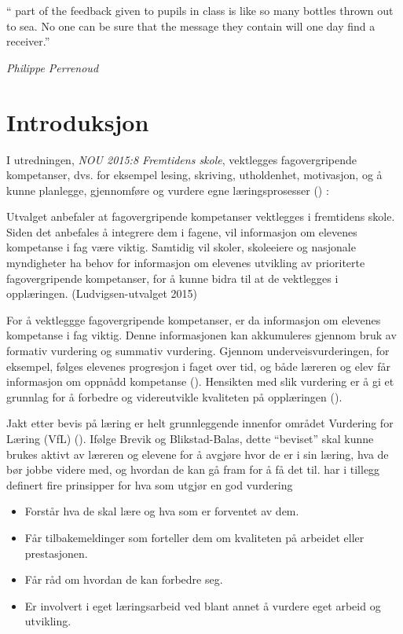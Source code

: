 \documentclass[main.tex]{subfiles}
\begin{document}
\setlength{\epigraphwidth}{0.8\textwidth}
\epigraph{``\textelp{} part of the feedback given to pupils in class is like so many 
bottles thrown out to sea. No one can be sure that the message they contain will one day 
find a receiver.''}
{\textit{Philippe Perrenoud}}

\section*{Introduksjon}
I utredningen, \emph{NOU 2015:8 Fremtidens skole}, vektlegges fagovergripende kompetanser, dvs. 
for eksempel lesing, skriving, utholdenhet, motivasjon, og å kunne planlegge, 
gjennomføre og vurdere egne læringsprosesser () :
\begin{displayquote}
Utvalget anbefaler at fagovergripende kompetanser vektlegges i fremtidens skole. Siden det  
anbefales å integrere dem i fagene, vil informasjon om elevenes kompetanse i fag være viktig.  
Samtidig vil skoler, skoleeiere og nasjonale myndigheter ha behov for informasjon om elevenes utvikling av 
prioriterte fagovergripende kompetanser, for å kunne bidra til at de vektlegges i opplæringen. 
(Ludvigsen-utvalget 2015)
\end{displayquote}
For å vektleggge fagovergripende kompetanser, er da informasjon om elevenes kompetanse i fag viktig. 
Denne informasjonen kan akkumuleres gjennom bruk av formativ vurdering og summativ vurdering.
Gjennom underveisvurderingen, for eksempel, følges elevenes progresjon i faget over tid, og både læreren 
og elev får informasjon om oppnådd kompetanse (). Hensikten med slik vurdering er å 
gi et grunnlag for å forbedre og videreutvikle kvaliteten på opplæringen ().

Jakt etter bevis på læring er helt grunnleggende innenfor området Vurdering for Læring (VfL)
(). Ifølge Brevik og Blikstad-Balas, dette ``beviset'' skal kunne brukes aktivt
av læreren og elevene for å avgjøre hvor de er i sin læring, hva de bør jobbe videre med, og
hvordan de kan gå fram for å få det til.  har i tillegg definert fire
prinsipper for hva som utgjør en god vurdering 
\begin{itemize}
\item Forstår hva de skal lære og hva som er forventet av dem.
\item Får tilbakemeldinger som forteller dem om kvaliteten på arbeidet eller prestasjonen.
\item Får råd om hvordan de kan forbedre seg.
\item Er involvert i eget læringsarbeid ved blant annet å vurdere eget arbeid og utvikling.
\end{itemize}
\end{document}
